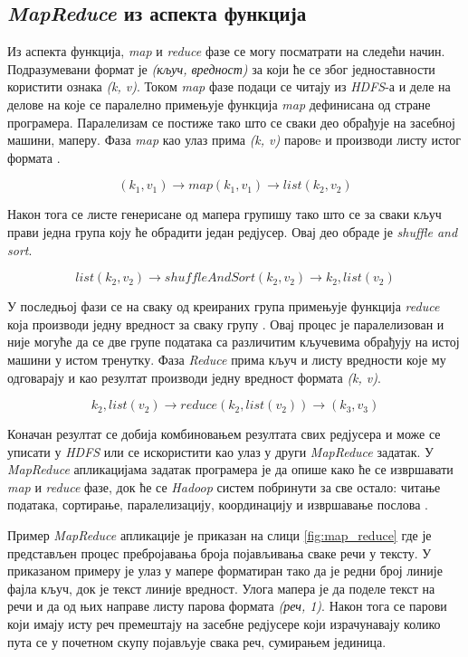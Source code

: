 \documentclass[12pt,oneside]{memoir}
\begin{document}
\subsection{\textit{MapReduce} из аспекта функција}
\label{subsec:mr_funck_asp}

Из аспекта функција, \textit{map} и \textit{reduce} фазе се могу посматрати на следећи начин. Подразумевани формат је \textit{(кључ, вредност)} за који ће се због једноставности користити ознака \textit{(k, v)}. Током \textit{map} фазе подаци се читају из \textit{HDFS}-а и деле на делове на које се паралелно примењује функција \textit{map} дефинисана од стране програмера. Паралелизам се постиже тако што се сваки део обрађује на засебној машини, маперу. Фаза \textit{map} као улаз прима \textit{(k, v)} паровe и производи листу истог формата \cite{hadoop_learning}.

$$ (k_1, v_1) \rightarrow map(k_1, v_1) \rightarrow list(k_2, v_2) $$

Након тога се листе генерисане од мапера групишу тако што се за сваки кључ прави једна група коју ће обрадити један редјусер. Овај део обраде је \textit{shuffle and sort}. 

$$ list(k_2, v_2) \rightarrow shuffleAndSort(k_2, v_2) \rightarrow k_2, list(v_2) $$

У последњој фази се на сваку од креираних група примењује функција \textit{reduce} која производи једну вредност за сваку групу \cite{hadoop_learning}. Овај процес је паралелизован и није могуће да се две групе података са различитим кључевима обрађују на истој машини у истом тренутку. Фаза \textit{Reduce} прима кључ и листу вредности које му одговарају и као резултат производи једну вредност формата \textit{(k, v)}.

$$ k_2, list(v_2) \rightarrow reduce(k_2, list(v_2)) \rightarrow (k_3, v_3) $$

Коначан резултат се добија комбиновањем резултата свих редјусера и може се уписати у \textit{HDFS} или се искористити као улаз у други \textit{MapReduce} задатак. У \textit{MapReduce} апликацијама задатак програмера је да опише како ће се извршавати \textit{map} и \textit{reduce} фазе, док ће се \textit{Hadoop} систем побринути за све остало: читање података, сортирање, паралелизацију, координацију и извршавање послова \cite{hadoop_beginner}.

Пример \textit{MapReduce} апликације је приказан на слици \ref{fig:map_reduce} где је представљен процес пребројавања броја појављивања сваке речи у тексту. У приказаном примеру је улаз у мапере форматиран тако да је редни број линије фајла кључ, док је текст линије вредност. Улога мапера је да поделе текст на речи и да од њих направе листу парова формата \textit{(реч, 1)}. Након тога се парови који имају исту реч премештају на засебне редјусере који израчунавају колико пута се у почетном скупу појављује свака реч, сумирањем јединица.
\end{document}
